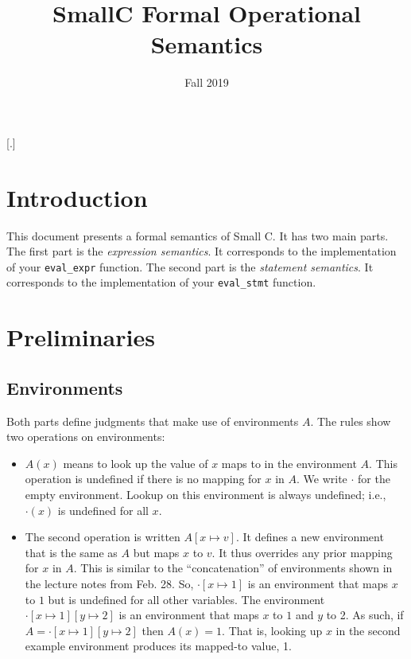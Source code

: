 \documentclass[10pt]{article}
\date{Fall 2019}
\begin{document}
\title{%
  SmallC Formal Operational Semantics}

\maketitle

\newcommand{\config}[2][A]{{#1};{#2}}
[.]
\titlespacing*{\subsection}{\parindent}{1ex}{1em}

\section{Introduction}

This document presents a formal semantics of Small C. It has two main
parts. The first part is the \emph{expression semantics}. It
corresponds to the implementation of your \texttt{eval\_expr}
function. The second part is the \emph{statement semantics}. It
corresponds to the implementation of your \texttt{eval\_stmt}
function.

\section{Preliminaries}

\subsection{Environments}

Both parts define judgments that make use of environments $A$. The
rules show two operations on environments:
\begin{itemize}
\item $A(x)$ means to look up the value of $x$ maps to in the
  environment $A$. This operation is undefined if there is no mapping
  for $x$ in $A$.  We write $\cdot$ for the empty environment. Lookup
  on this environment is always undefined; i.e., $\cdot(x)$ is
  undefined for all $x$.
\item The second operation is written $A[ x \mapsto v ]$. It defines a
  new environment that is the same as $A$ but maps $x$ to $v$. It thus
  overrides any prior mapping for $x$ in $A$. This is similar to the
  ``concatenation'' of environments shown in the lecture notes from
  Feb. 28. So, $\cdot[ x \mapsto 1 ]$ is an environment that maps $x$
  to $1$ but is undefined for all other variables. The environment
  $\cdot[ x \mapsto 1][y \mapsto 2]$ is an environment that maps $x$
  to $1$ and $y$ to 2. As such, if
  $A = \cdot[ x \mapsto 1][y \mapsto 2]$ then $A(x) = 1$. That is,
  looking up $x$ in the second example environment produces its
  mapped-to value, 1.
\end{itemize}
\end{document}
